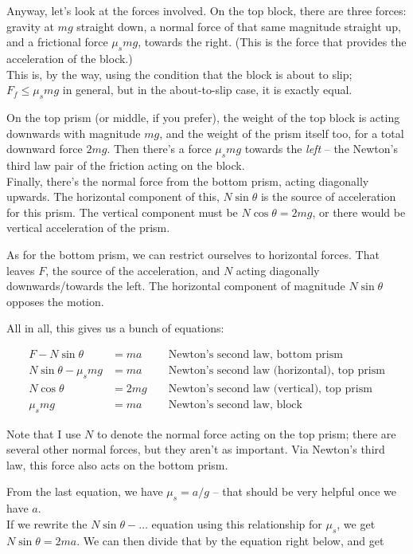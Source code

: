 \documentclass[8.01x]{subfiles}
\begin{document}
Anyway, let's look at the forces involved. On the top block, there are three forces: gravity at $m g$ straight down, a normal force of that same magnitude straight up, and a frictional force $\mu_s m g$, towards the right. (This is the force that provides the acceleration of the block.)\\
This is, by the way, using the condition that the block is about to slip; $F_f \le \mu_s m g$ in general, but in the about-to-slip case, it is exactly equal.

On the top prism (or middle, if you prefer), the weight of the top block is acting downwards with magnitude $m g$, and the weight of the prism itself too, for a total downward force $2 m g$. Then there's a force $\mu_s m g$ towards the \emph{left} -- the Newton's third law pair of the friction acting on the block.\\
Finally, there's the normal force from the bottom prism, acting diagonally upwards. The horizontal component of this, $N \sin \theta$ is the source of acceleration for this prism. The vertical component must be $N \cos \theta = 2 m g$, or there would be vertical acceleration of the prism.

As for the bottom prism, we can restrict ourselves to horizontal forces. That leaves $F$, the source of the acceleration, and $N$ acting diagonally downwards/towards the left. The horizontal component of magnitude $N \sin \theta$ opposes the motion.

All in all, this gives us a bunch of equations:

\begin{align}
F - N \sin \theta &= m a &&\text{ Newton's second law, bottom prism}\\
N \sin \theta - \mu_s m g &= m a &&\text{ Newton's second law (horizontal), top prism}\\
N \cos \theta &= 2 m g &&\text{ Newton's second law (vertical), top prism}\\
\mu_s m g &= m a &&\text{ Newton's second law, block}
\end{align}

Note that I use $N$ to denote the normal force acting on the top prism; there are several other normal forces, but they aren't as important. Via Newton's third law, this force also acts on the bottom prism.

From the last equation, we have $\mu_s = a/g$ -- that should be very helpful once we have $a$.\\
If we rewrite the $N \sin \theta - \dots$ equation using this relationship for $\mu_s$, we get $N \sin \theta = 2 ma$. We can then divide that by the equation right below, and get
\end{document}

